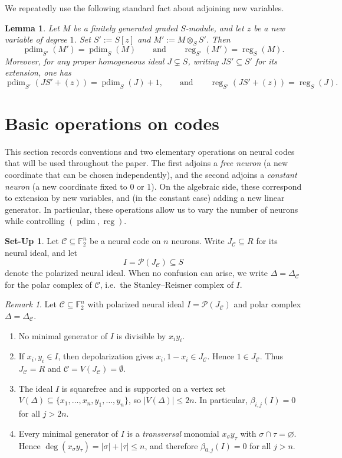 \documentclass[12pt]{amsart}
\newtheorem{lemma}[theorem]{Lemma}
\theoremstyle{remark}
\newtheorem{remark}[theorem]{Remark}
\theoremstyle{definition}
\newtheorem{setup}[theorem]{Set-Up}
\DeclareMathOperator{\reg}{reg}
\DeclareMathOperator{\pd}{pdim}
\newcommand{\F}{\mathbb{F}}
\newcommand{\C}{\mathcal{C}}
\def\P{{\mathcal P}}
\begin{document}
We  repeatedly use the following standard fact about adjoining new variables.

\begin{lemma}\label{lem:add_variable_pd_reg}
Let $M$ be a finitely generated graded $S$-module,
and let $z$ be a new variable of degree $1$. Set $S':=S[z]$ and $M':=M\otimes_S S'$.
Then
\[
\pd_{S'}(M')=\pd_S(M)
\qquad\text{and}\qquad
\reg_{S'}(M')=\reg_S(M).
\]
Moreover, for any proper homogeneous ideal $J\subsetneq S$, writing $J S'\subseteq S'$ for its extension,
one has
\[
\pd_{S'}(J S'+(z))=\pd_{S}(J)+1,
\qquad\text{and}\qquad
\reg_{S'}(J S'+(z))=\reg_{S}(J).
\]
\end{lemma}


\section{Basic operations on codes}\label{sec:toolkit}

This section records conventions and two elementary operations on neural codes that  will be used
throughout the paper.  The first adjoins a \emph{free neuron} (a new coordinate that can be chosen
independently), and the second adjoins a \emph{constant neuron} (a new coordinate fixed to $0$ or $1$).
On the algebraic side, these correspond to extension by new variables, and (in the constant
case) adding a new linear generator.  In particular, these operations allow us to vary the number of
neurons while controlling $(\pd,\reg)$.

\begin{setup}\label{setup:polarized-canonical}
Let $\C\subseteq\F_2^n$ be a neural code on $n$ neurons.  Write $J_\C\subseteq R$ for its neural ideal,
and let
\[
I  =  \P(J_\C) \subseteq  S
\]
denote the polarized neural ideal.  When no confusion can arise, we write $\Delta=\Delta_\C$ for the
polar complex of $\C$, i.e.\ the Stanley--Reisner complex of $I$.
\end{setup}

\begin{remark}\label{rem:basic_degree_bounds}
Let $\C\subseteq\F_2^n$ with polarized neural ideal $I=\P(J_\C)$ and polar complex $\Delta=\Delta_\C$.
\begin{enumerate}[label=(\alph*)]
\item No minimal generator of $I$ is divisible by $x_i y_i$.

\item If $x_i,y_i\in I$, then depolarization gives $x_i, 1-x_i\in J_\C$. Hence $1\in J_\C$.
Thus $J_\C=R$ and $\C=V(J_\C)=\emptyset$.

\item The ideal $I$ is squarefree and is supported on a vertex set
$V(\Delta)\subseteq\{x_1,\dots,x_n,y_1,\dots,y_n\}$, so $|V(\Delta)|\le 2n$.
In particular, $\beta_{i,j}(I)=0$ for all $j>2n$.

\item Every minimal generator of $I$ is a \emph{transversal} monomial $x_\sigma y_\tau$ with
$\sigma\cap\tau=\varnothing$.  Hence $\deg(x_\sigma y_\tau)=|\sigma|+|\tau|\le n$, and therefore
$\beta_{0,j}(I)=0$ for all $j>n$.
\end{enumerate}
\end{remark}
\end{document}
